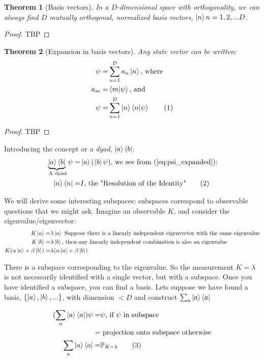 \documentclass[]{article}
\newcommand\numberthis{\addtocounter{equation}{1}\tag{\theequation}}
\newtheorem{thm}{Theorem}
\begin{document}
\begin{thm}[Basis vectors]
	In a $D$-dimensional space with orthogonality, we can always find $D$ mutually orthogonal, normalized basis vectors, $\ket{n} n=1,2,...D$.
\end{thm}
\begin{proof}
	TBP
\end{proof}
\begin{thm}[Expansion in basis vectors]
	Any state vector can be written:
	\begin{align*}
		\psi =& \sum_{n=1}^{D} a_n \ket{n} \text{, where}\\
		a_m =& \braket{m\vert\psi} \text{, and}\\
		\psi =& \sum_{n=1}^{D} \ket{n} \braket{n\vert\psi} \numberthis \label{eq:psi_expanded}
	\end{align*}
\end{thm}
\begin{proof}
	TBP
\end{proof}
Introducing the concept or a \emph{dyad}, $\ket{a}\bra{b}$:
\begin{align*}
	\underbrace{\ket{a}\bra{b}}_\text{ A dyad}\psi =& \ket{a}(\bra{b}\psi) \text{, we see from (\ref{eq:psi_expanded}):}\\
	\ket{n}\bra{n} =& I \text{, the "Resolution of the Identity"} \numberthis \label{eq:resolution:identity}
\end{align*}

We will derive some interesting subspaces: subspaces correspond to observable questions that we might ask. Imagine an observable $K$, and consider the eigenvalue/eigenvector:
\begin{align*}
	K \ket{a} =& \lambda \ket{a} \text{ Suppose there is a linearly independent eigenvector with the same eigenvalue}\\
	K \ket{b} =& \lambda \ket{b} \text{, then any linearly independent combination is also an eigenvalue}\\
	K(\alpha \ket{a} + \beta \ket{b}) =& \lambda (\alpha \ket{a} + \beta \ket{b})
\end{align*}

There is a subspace corresponding to the eigenvalue. So the measurement $K=\lambda$ is not necessarily identified with a single vector, but with a subspace. Once you have identified a subspace, you can find a basis. Lets suppose we have found a basis, $\{\ket{a}, \ket{b},...\}$, with dimension $<D$ and construct $\sum_a \ket{a} \bra{a}$

\begin{align*}
	(\sum_a \ket{a} \bra{a}) \psi =& \psi \text{, if $\psi$ in subspace}\\
	=& \text{ projection onto subspace otherwise}\\
	\sum_a \ket{a} \bra{a} =& \mathbb{P}_{K=\lambda} \numberthis \label{eq:projection}
\end{align*}
\end{document}

